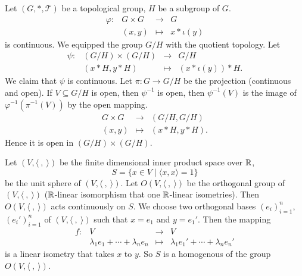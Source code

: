 \begin{exampleenv}
    Let $(G,*,\mathscr{T})$ be a topological group,
    $H$ be a subgroup of $G$.
    $$\begin{array}{rrcl}
        \varphi : & G \times G & \longrightarrow & G\\
        & (x,y) & \longmapsto & x * \iota(y)
    \end{array}$$
    is continuous.
    We equipped the group $G/H$ with the quotient topology.
    Let
    $$\begin{array}{rrcl}
        \psi : & (G/H) \times (G/H) & \longrightarrow & G/H\\
        & (x * H, y * H) & \longmapsto & (x * \iota(y)) * H.
    \end{array}$$
    We claim that $\psi$ is continuous.
    Let $\pi : G \rightarrow G/H$ be the projection (continuous and open).
    If $V \subseteq G/H$ is open, then $\psi^{-1}$ is open, then $\psi^{-1}(V)$ is the image of $\varphi^{-1}(\pi^{-1}(V))$ by the open mapping.
    $$\begin{array}{rcl}
        G \times G & \longrightarrow & (G/H, G/H)\\
        (x, y) & \longmapsto & (x * H, y * H).
    \end{array}$$
    Hence it is open in $(G/H) \times (G/H)$.
\end{exampleenv}

\begin{exampleenv}
    Let $(V, \langle\ ,\ \rangle)$ be the finite dimensional inner product space over $\mathbb{R}$,
    $$ S =\{x \in V \mid \langle x, x \rangle = 1\}$$
    be the unit sphere of $(V,\langle\ ,\ \rangle)$.
    Let $O(V,\langle\ ,\ \rangle)$ be the orthogonal group of $(V,\langle\ ,\ \rangle)$ ($\mathbb{R}$-linear isomorphism that one $\mathbb{R}$-linear isometries).
    Then $O(V,\langle\ ,\ \rangle)$ acts continuously on $S$.
    We choose two orthogonal bases $\left(e_i\right)_{i=1}^n$, $\left(e_i'\right)_{i = 1}^{n}$ of $(V,\langle\ ,\ \rangle)$ such that $x = e_1$ and $y = e_1'$.
    Then the mapping
    $$\begin{array}{rrcl}
        f : & V & \longrightarrow & V\\
        & \lambda_1 e_1 + \cdots + \lambda_n e_n & \longmapsto & \lambda_1 e_1' + \cdots + \lambda_n e_n'
    \end{array}$$
    is a linear isometry that takes $x$ to $y$.
    So $S$ is a homogenous of the group $O(V,\langle\ ,\ \rangle)$.
\end{exampleenv}

